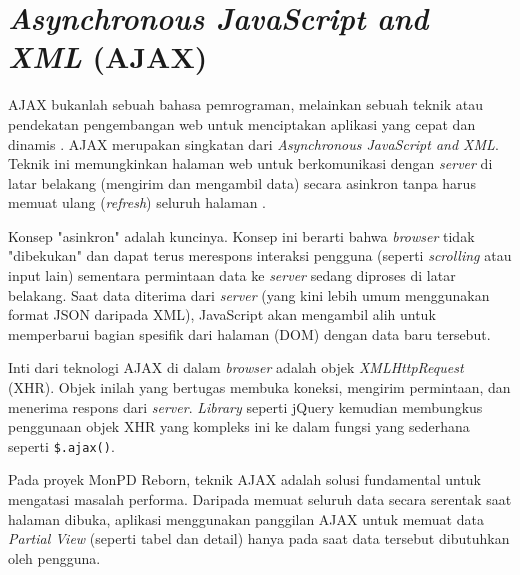 \section{\emph{Asynchronous JavaScript and XML} (AJAX)}
\label{sec:ajax}

AJAX bukanlah sebuah bahasa pemrograman, melainkan sebuah teknik atau pendekatan pengembangan web untuk menciptakan aplikasi yang cepat dan dinamis \cite{aws_ajax}. AJAX merupakan singkatan dari \emph{Asynchronous JavaScript and XML}. Teknik ini memungkinkan halaman web untuk berkomunikasi dengan \emph{server} di latar belakang (mengirim dan mengambil data) secara asinkron tanpa harus memuat ulang (\emph{refresh}) seluruh halaman \cite{w3schools_ajax}.

Konsep "asinkron" adalah kuncinya. Konsep ini berarti bahwa \emph{browser} tidak "dibekukan" dan dapat terus merespons interaksi pengguna (seperti \emph{scrolling} atau input lain) sementara permintaan data ke \emph{server} sedang diproses di latar belakang. Saat data diterima dari \emph{server} (yang kini lebih umum menggunakan format JSON daripada XML), JavaScript akan mengambil alih untuk memperbarui bagian spesifik dari halaman (DOM) dengan data baru tersebut.

Inti dari teknologi AJAX di dalam \emph{browser} adalah objek \emph{XMLHttpRequest} (XHR). Objek inilah yang bertugas membuka koneksi, mengirim permintaan, dan menerima respons dari \emph{server}. \emph{Library} seperti jQuery kemudian membungkus penggunaan objek XHR yang kompleks ini ke dalam fungsi yang sederhana seperti \texttt{\$.ajax()}.

Pada proyek MonPD Reborn, teknik AJAX adalah solusi fundamental untuk mengatasi masalah performa. Daripada memuat seluruh data secara serentak saat halaman dibuka, aplikasi menggunakan panggilan AJAX untuk memuat data \emph{Partial View} (seperti tabel dan detail) hanya pada saat data tersebut dibutuhkan oleh pengguna. 

